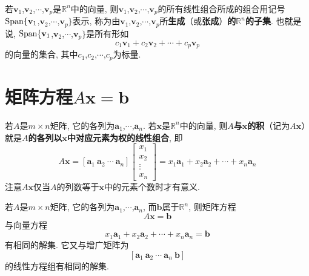 \\[4ex]

\begin{definition}
若$\mathbf{v}_1$,$\mathbf{v}_2$,$\cdots$,$\mathbf{v}_p$是$\mathbb{R}^n$中的向量, 则$\mathbf{v}_1$,$\mathbf{v}_2$,$\cdots$,$\mathbf{v}_p$的所有线性组合所成的组合用记号$\operatorname{Span}\{\mathbf{v}_1$,$\mathbf{v}_2$,$\cdots$,$\mathbf{v}_p\}$表示, 称为由$\mathbf{v}_1$,$\mathbf{v}_2$,$\cdots$,$\mathbf{v}_p$所\textbf{生成}（或\textbf{张成}）\textbf{的$\mathbb{R}^n$的子集}. 也就是说, $\operatorname{Span}\{\mathbf{v}_1$,$\mathbf{v}_2$,$\cdots$,$\mathbf{v}_p\}$是所有形如
	\[c_1\mathbf{v}_1+c_2\mathbf{v}_2+\cdots+c_p\mathbf{v}_p\]
的向量的集合, 其中$c_1$,$c_2$,$\cdots$,$c_p$为标量.\\[2ex]
\end{definition}\vspace{4ex}

\section{矩阵方程$A\mathbf{x}=\mathbf{b}$}
\begin{definition}
若$A$是$m\times n$矩阵, 它的各列为$\bm{a}_1$,$\cdots$,$\bm{a}_n$. 若$\bm{x}$是$\mathbb{R}^n$中的向量, 则\textbf{$A$与$\bm{x}$的积}（记为$A\bm{x}$）就是\textbf{$A$的各列以$\bm{x}$中对应元素为权的线性组合}, 即
	\[A\bm{x}=[\bm{a}_1\ \bm{a}_2\ \cdots\ \bm{a}_n]\left[\begin{array}{c}x_1\\x_2\\\vdots\\x_n\end{array}\right]=x_1\bm{a}_1+x_2\bm{a}_2+\cdots+x_n\bm{a}_n\]
注意$A\bm{x}$仅当$A$的列数等于$\bm{x}$中的元素个数时才有意义.\\[2ex]
\end{definition}

\begin{TheoremOne}
若$A$是$m\times n$矩阵, 它的各列为$\bm{a}_1$,$\cdots$,$\bm{a}_n$, 而$\bm{b}$属于$\mathbb{R}^n$, 则矩阵方程
\[A\bm{x}=\bm{b}\]
与向量方程
\[x_1\bm{a}_1+x_2\bm{a}_2+\cdots+x_n\bm{a}_n=\bm{b}\]
有相同的解集. 它又与增广矩阵为
\[[\bm{a}_1\ \bm{a}_2\ \cdots\ \bm{a}_n\ \bm{b}]\]
的线性方程组有相同的解集.\\[2ex]
\end{TheoremOne}\vspace{2ex}

